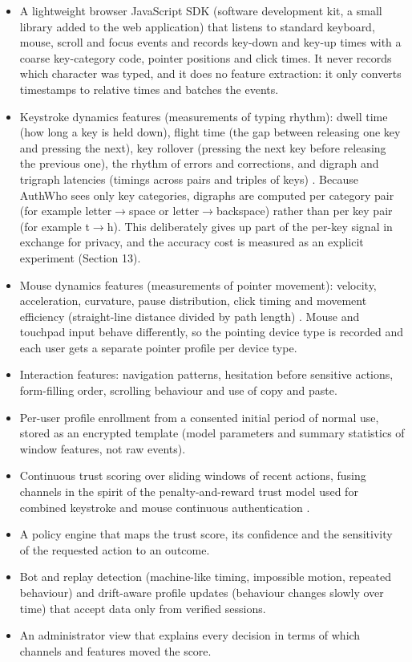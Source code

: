 \documentclass[10pt,letterpaper]{article}
\begin{document}
\begin{itemize}
  \item A lightweight browser JavaScript SDK (software development kit, a small library added to the web application) that listens to standard keyboard, mouse, scroll and focus events and records key-down and key-up times with a coarse key-category code, pointer positions and click times. It never records which character was typed, and it does no feature extraction: it only converts timestamps to relative times and batches the events.
  \item Keystroke dynamics features (measurements of typing rhythm): dwell time (how long a key is held down), flight time (the gap between releasing one key and pressing the next), key rollover (pressing the next key before releasing the previous one), the rhythm of errors and corrections, and digraph and trigraph latencies (timings across pairs and triples of keys) \cite{monrose2000,killourhy2009,dhakal2018}. Because AuthWho sees only key categories, digraphs are computed per category pair (for example letter$\rightarrow$space or letter$\rightarrow$backspace) rather than per key pair (for example t$\rightarrow$h). This deliberately gives up part of the per-key signal in exchange for privacy, and the accuracy cost is measured as an explicit experiment (Section 13).
  \item Mouse dynamics features (measurements of pointer movement): velocity, acceleration, curvature, pause distribution, click timing and movement efficiency (straight-line distance divided by path length) \cite{ahmed2007,shen2013,antal2021}. Mouse and touchpad input behave differently, so the pointing device type is recorded and each user gets a separate pointer profile per device type.
  \item Interaction features: navigation patterns, hesitation before sensitive actions, form-filling order, scrolling behaviour and use of copy and paste.
  \item Per-user profile enrollment from a consented initial period of normal use, stored as an encrypted template (model parameters and summary statistics of window features, not raw events).
  \item Continuous trust scoring over sliding windows of recent actions, fusing channels in the spirit of the penalty-and-reward trust model used for combined keystroke and mouse continuous authentication \cite{mondal2017}.
  \item A policy engine that maps the trust score, its confidence and the sensitivity of the requested action to an outcome.
  \item Bot and replay detection (machine-like timing, impossible motion, repeated behaviour) and drift-aware profile updates (behaviour changes slowly over time) that accept data only from verified sessions.
  \item An administrator view that explains every decision in terms of which channels and features moved the score.
\end{itemize}
\end{document}
